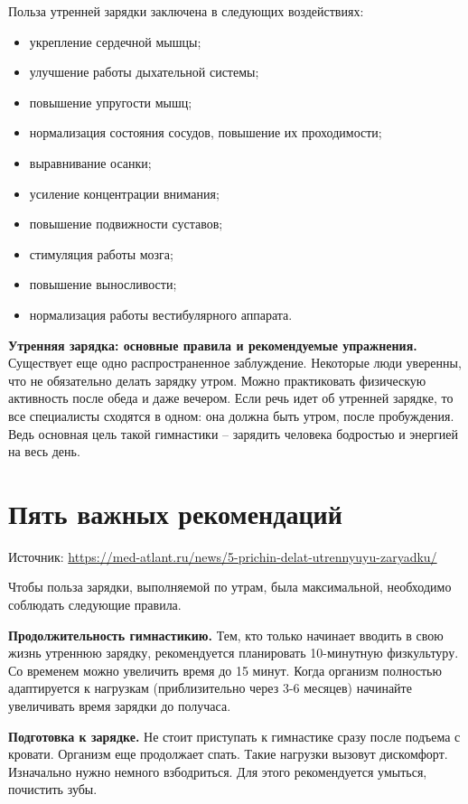 Польза утренней зарядки заключена в следующих воздействиях:

\begin{itemize}
    \item укрепление сердечной мышцы;
    \item улучшение работы дыхательной системы;
    \item повышение упругости мышц;
    \item нормализация состояния сосудов, повышение их проходимости;
    \item выравнивание осанки;
    \item усиление концентрации внимания;
    \item повышение подвижности суставов;
    \item стимуляция работы мозга;
    \item повышение выносливости;
    \item нормализация работы вестибулярного аппарата.
\end{itemize}

\textbf{Утренняя зарядка: основные правила и рекомендуемые упражнения.} Существует еще одно распространенное заблуждение. Некоторые люди уверенны, что не обязательно делать зарядку утром. Можно практиковать физическую активность после обеда и даже вечером. Если речь идет об утренней зарядке, то все специалисты сходятся в одном: она должна быть утром, после пробуждения. Ведь основная цель такой гимнастики – зарядить человека бодростью и энергией на весь день.

\section{Пять важных рекомендаций}
Источник: \url{https://med-atlant.ru/news/5-prichin-delat-utrennyuyu-zaryadku/}

Чтобы польза зарядки, выполняемой  по утрам, была максимальной, необходимо соблюдать следующие правила.

\textbf{Продолжительность гимнастикию.} Тем, кто только начинает вводить в свою жизнь утреннюю зарядку, рекомендуется планировать 10-минутную физкультуру. Со временем можно увеличить время до 15 минут. Когда организм полностью адаптируется к нагрузкам (приблизительно через 3-6 месяцев) начинайте увеличивать время зарядки до получаса.

\textbf{Подготовка к зарядке.} Не стоит приступать к гимнастике сразу после подъема с кровати. Организм еще продолжает спать. Такие нагрузки вызовут дискомфорт. Изначально нужно немного взбодриться. Для этого рекомендуется умыться, почистить зубы.

